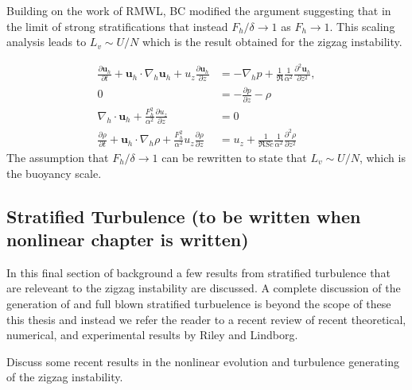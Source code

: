 Building on the work of RMWL, BC modified the argument suggesting that in the limit of strong stratifications that instead $F_{h}/\delta\rightarrow 1$ as $F_{h}\rightarrow 1$. This scaling analysis leads to $L_{v} \sim U/N$ which is the result obtained for the zigzag instability.

\begin{align}
\frac{\partial \textbf{u}_{h}}{\partial t} + \textbf{u}_{h}\cdot\nabla_{h}\textbf{u}_{h}+u_{z}\frac{\partial \textbf{u}_{h}}{\partial z} &= -\nabla_{h}p + \frac{1}{\Re}\frac{1}{\alpha^{2}}\frac{\partial^{2}\textbf{u}_{h}}{\partial z^{2}},\\
0&= -\frac{\partial p}{\partial z} - \rho  \\
\nabla_{h}\cdot\textbf{u}_{h}+ \frac{F_{h}^{2}}{\alpha^{2}}\frac{\partial u_{z}}{\partial z} &=0\\
\frac{\partial \rho}{\partial t} + \textbf{u}_{h}\cdot\nabla_{h}\rho + \frac{F_{h}^{2}}{\alpha^{2}}u_{z}\frac{\partial \rho}{\partial z} &= u_{z} + \frac{1}{\Re Sc}\frac{1}{\alpha^{2}}\frac{\partial^{2}\rho}{\partial z^{2}} 
\end{align} 
The assumption that $F_{h}/\delta \rightarrow 1$ can be rewritten to state that $L_{v} \sim U/N$, which is the buoyancy scale. 
\subsection{Stratified Turbulence (to be written when nonlinear chapter is written)}
In this final section of background a few results from stratified turbulence that are releveant to the zigzag instability are discussed. A complete discussion of the generation of and full blown stratified turbuelence is beyond the scope of these this thesis and instead we refer the reader to a recent review of recent theoretical, numerical, and experimental results by Riley and Lindborg. 

Discuss some recent results in the nonlinear evolution and turbulence generating of the zigzag instability. 



